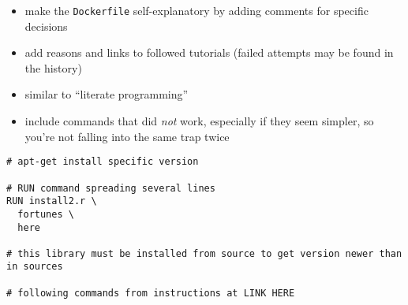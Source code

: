 \documentclass[10pt,letterpaper]{article}
\providecommand{\tightlist}{%
  \setlength{\itemsep}{0pt}\setlength{\parskip}{0pt}}
\begin{document}
\begin{itemize}
  \begin{itemize}
  \tightlist
  \item
    make the \texttt{Dockerfile} self-explanatory by adding comments for
    specific decisions
  \item
    add reasons and links to followed tutorials (failed attempts may be
    found in the history)
  \item
    similar to ``literate programming''
  \item
    include commands that did \emph{not} work, especially if they seem
    simpler, so you're not falling into the same trap twice
  \end{itemize}
\end{itemize}

\begin{verbatim}
# apt-get install specific version

# RUN command spreading several lines
RUN install2.r \
  fortunes \
  here

# this library must be installed from source to get version newer than in sources

# following commands from instructions at LINK HERE
\end{verbatim}
\end{document}
